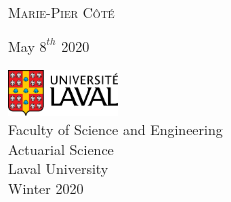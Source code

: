 \begin{titlepage}
		{\scshape\Large Marie-Pier Côté \\} %
		
		\vspace*{3\baselineskip}
		
		May $8^{th}$ 2020
		
		\vspace{0.5\baselineskip} %
		
		\vfill %
		
		
		\includegraphics[height=1.2cm]{UL_P.pdf}\\
		
		Faculty of Science and Engineering\\
		Actuarial Science\\
		Laval University\\
		Winter 2020       
	\end{titlepage}